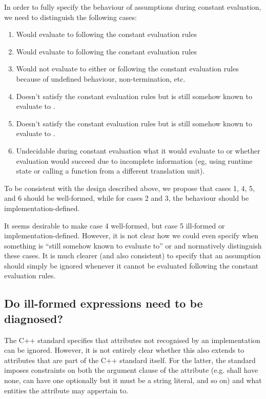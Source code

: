 In order to fully specify the behaviour of assumptions during constant evaluation, we need to distinguish the following cases:

\begin{enumerate}
\item Would evaluate to  following the constant evaluation rules
\item Would evaluate to  following the constant evaluation rules
\item Would not evaluate to either  or  following the constant evaluation rules because of undefined behaviour, non-termination, etc.
\item Doesn't satisfy the constant evaluation rules but is still somehow known to evaluate to .
\item Doesn't satisfy the constant evaluation rules but is still somehow known to evaluate to .
\item Undecidable during constant evaluation what it would evaluate to or whether evaluation would succeed due to incomplete information (eg, using runtime state or calling a function from a different translation unit).
\end{enumerate}

To be consistent with the design described above, we propose that cases 1, 4, 5, and 6 should be well-formed, while for cases 2 and 3, the behaviour should be implementation-defined.

It seems desirable to make case 4 well-formed, but case 5 ill-formed or implementation-defined. However, it is not clear how we could even specify when something is ``still somehow known to evaluate to''  or  and normatively distinguish these cases. It is much clearer (and also consistent) to specify that an assumption should simply be ignored whenever it cannot be evaluated following the constant evaluation rules.

\subsection{Do ill-formed expressions need to be diagnosed?}
\label{subsec:well_formed}

The C++ standard specifies that attributes not recognised by an implementation can be ignored. However, it is not entirely clear whether this also extends to attributes that are part of the C++ standard itself. For the latter, the standard imposes constraints on both the argument clause of the attribute (e.g. \tcode{[[noreturn]]} shall have none, \tcode{[[deprecated]]} can have one optionally but it must be a string literal, and so on) and what entities the attribute may appertain to.

